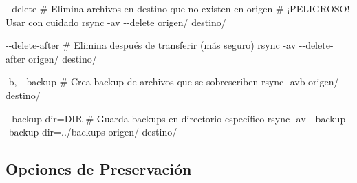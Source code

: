 \documentclass[
  doc,
  floatsintext,
  longtable,
  a4paper,
  nolmodern,
  notxfonts,
  notimes,
  12pt,
  colorlinks=true,linkcolor=blue,citecolor=blue,urlcolor=blue]{apa7}
\newenvironment{Shaded}{\begin{snugshade}}{\end{snugshade}}
\newcommand{\AttributeTok}[1]{\textcolor[rgb]{0.40,0.45,0.13}{#1}}
\newcommand{\CommentTok}[1]{\textcolor[rgb]{0.37,0.37,0.37}{#1}}
\newcommand{\ExtensionTok}[1]{\textcolor[rgb]{0.00,0.23,0.31}{#1}}
\newcommand{\FunctionTok}[1]{\textcolor[rgb]{0.28,0.35,0.67}{#1}}
\newcommand{\NormalTok}[1]{\textcolor[rgb]{0.00,0.23,0.31}{#1}}
\newcommand{\OperatorTok}[1]{\textcolor[rgb]{0.37,0.37,0.37}{#1}}
\begin{document}
\begin{Shaded}
\begin{Highlighting}[]
\ExtensionTok{{-}{-}delete}
    \CommentTok{\# Elimina archivos en destino que no existen en origen}
    \CommentTok{\# ¡PELIGROSO! Usar con cuidado}
    \FunctionTok{rsync} \AttributeTok{{-}av} \AttributeTok{{-}{-}delete}\NormalTok{ origen/ destino/}

\ExtensionTok{{-}{-}delete{-}after}
    \CommentTok{\# Elimina después de transferir (más seguro)}
    \FunctionTok{rsync} \AttributeTok{{-}av} \AttributeTok{{-}{-}delete{-}after}\NormalTok{ origen/ destino/}

\ExtensionTok{{-}b,} \AttributeTok{{-}{-}backup}
    \CommentTok{\# Crea backup de archivos que se sobrescriben}
    \FunctionTok{rsync} \AttributeTok{{-}avb}\NormalTok{ origen/ destino/}

\ExtensionTok{{-}{-}backup{-}dir=DIR}
    \CommentTok{\# Guarda backups en directorio específico}
    \FunctionTok{rsync} \AttributeTok{{-}av} \AttributeTok{{-}{-}backup} \AttributeTok{{-}{-}backup{-}dir}\OperatorTok{=}\NormalTok{../backups origen/ destino/}
\end{Highlighting}
\end{Shaded}

\subsection{Opciones de Preservación}\label{opciones-de-preservaciuxf3n}
\end{document}
